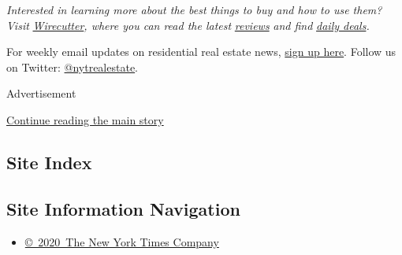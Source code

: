 \emph{Interested in learning more about the best things to buy and how
to use them? Visit}
\href{https://www.nytimes3xbfgragh.onion/wirecutter/?utm_source=nytimes\&utm_medium=referral\&utm_campaign=wcrealestate\&utm_content=outdoor-space}{\emph{Wirecutter}}\emph{,
where you can read the latest}
\href{https://www.nytimes3xbfgragh.onion/wirecutter/reviews?utm_source=nytimes\&utm_medium=referral\&utm_campaign=wcrealestate\&utm_content=outdoor-space}{\emph{reviews}}
\emph{and find}
\href{https://www.nytimes3xbfgragh.onion/wirecutter/deals/?utm_source=nytimes\&utm_medium=referral\&utm_campaign=wcrealestate\&utm_content=outdoor-space}{\emph{daily
deals}}\emph{.}

For weekly email updates on residential real estate news,
\href{http://www.nytimes3xbfgragh.onion/newsletters/realestate/}{sign up
here}. Follow us on Twitter:
\href{https://twitter.com/nytrealestate}{@nytrealestate}.

Advertisement

\protect\hyperlink{after-bottom}{Continue reading the main story}

\hypertarget{site-index}{%
\subsection{Site Index}\label{site-index}}

\hypertarget{site-information-navigation}{%
\subsection{Site Information
Navigation}\label{site-information-navigation}}

\begin{itemize}
\tightlist
\item
  \href{https://help.nytimes3xbfgragh.onion/hc/en-us/articles/115014792127-Copyright-notice}{©~2020~The
  New York Times Company}
\end{itemize}


